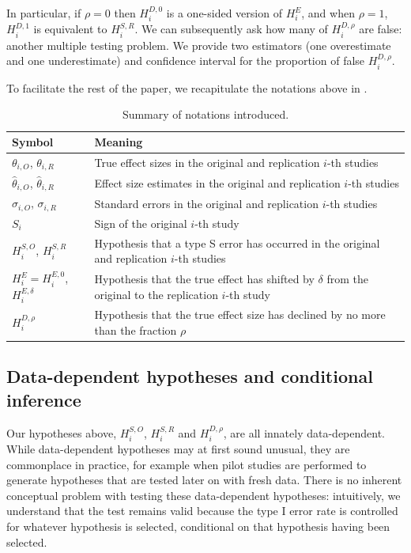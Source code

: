 \documentclass[aoas, preprint]{imsart}
\theoremstyle{definition}
\theoremstyle{custom}
\newcommand{\htheta}{\hat{\theta}}
\begin{document}
  In particular, if $\rho=0$ then $H_i^{D,0}$ is a one-sided version of $H_i^E$, and when $\rho=1$, $H_i^{D,1}$ is equivalent to $H_i^{S,R}$. We can subsequently ask how many of $H_i^{D,\rho}$ are false: another multiple testing problem. We provide two estimators (one overestimate and one underestimate) and confidence interval for the proportion of false $H_i^{D,\rho}$.

  To facilitate the rest of the paper, we recapitulate the notations above in .
  \begin{table}[htbp]
    \centering
    \begin{tabularx}{\textwidth}{lX}
      \toprule
      Symbol & Meaning \\
      \midrule
      $\theta_{i,O}$, $\theta_{i,R}$ & True effect sizes in the original and replication $i$-th studies \\
      $\htheta_{i,O}$, $\htheta_{i,R}$ & Effect size estimates in the original and replication $i$-th studies \\
      $\sigma_{i,O}$, $\sigma_{i,R}$ & Standard errors in the original and replication $i$-th studies \\
      $S_i$ & Sign of the original $i$-th study \\
      $H_i^{S,O}$, $H_i^{S,R}$ & Hypothesis that a type S error has occurred in the original and replication $i$-th studies  \\
      $H_i^E = H_i^{E,0}$, $H_i^{E,\delta}$ & Hypothesis that the true effect has shifted by $\delta$ from the original to the replication $i$-th study \\
      $H_i^{D,\rho}$ & Hypothesis that the true effect size has declined by no more than the fraction $\rho$ \\
      \bottomrule
    \end{tabularx}
    \caption{Summary of notations introduced.}
  \label{tbl:notation}
  \end{table}

\subsection{Data-dependent hypotheses and conditional inference}

  Our hypotheses above, $H_i^{S,O}$, $H_i^{S,R}$ and $H_i^{D,\rho}$, are all innately data-dependent. While data-dependent hypotheses may at first sound unusual, they are commonplace in practice, for example when pilot studies are performed to generate hypotheses that are tested later on with fresh data. There is no inherent conceptual problem with testing these data-dependent hypotheses: intuitively, we understand that the test remains valid because the type I error rate is controlled for whatever hypothesis is selected, conditional on that hypothesis having been selected.
\end{document}
